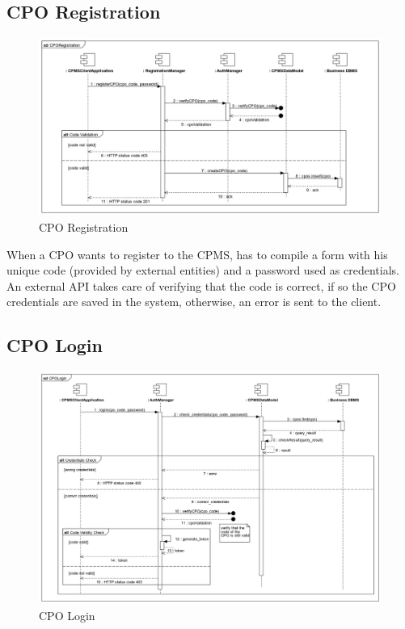 \documentclass{Configuration_Files/PoliMi3i_thesis}
\begin{document}
\subsection{CPO Registration}
\begin{figure}[H]
    \centering
    \includegraphics[width=1\textwidth]{Images/sequenceDiagrams/CPORegistration.jpg}
    \caption{CPO Registration}
\end{figure}

When a CPO wants to register to the CPMS, has to compile a form with his unique code (provided by external entities) and a password used as credentials. An external API takes care of verifying that the code is correct, if so the CPO credentials are saved in the system, otherwise, an error is sent to the client.

\subsection{CPO Login}
\begin{figure}[H]
    \centering
    \includegraphics[width=1\textwidth]{Images/sequenceDiagrams/CPOLogin.jpg}
    \caption{CPO Login}
\end{figure}
\end{document}
